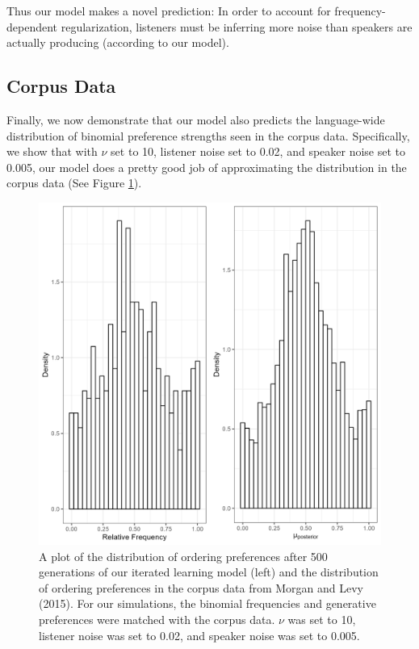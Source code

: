 \documentclass[
  jou,floatsintext]{apa6}
\begin{document}
Thus our model makes a novel prediction: In order to account for frequency-dependent regularization, listeners must be inferring more noise than speakers are actually producing (according to our model).

\subsection{Corpus Data}\label{corpus-data}

Finally, we now demonstrate that our model also predicts the language-wide distribution of binomial preference strengths seen in the corpus data. Specifically, we show that with \(\nu\) set to 10, listener noise set to 0.02, and speaker noise set to 0.005, our model does a pretty good job of approximating the distribution in the corpus data (See Figure \ref{fig:corpusourmodel}).



\begin{figure}

{\centering \includegraphics[width=1\linewidth]{Figures/corpus_plot_and_ours} 

}

\caption{A plot of the distribution of ordering preferences after 500 generations of our iterated learning model (left) and the distribution of ordering preferences in the corpus data from Morgan and Levy (2015). For our simulations, the binomial frequencies and generative preferences were matched with the corpus data. \(\nu\) was set to 10, listener noise was set to 0.02, and speaker noise was set to 0.005.}\label{fig:corpusourmodel}
\end{figure}
\end{document}
